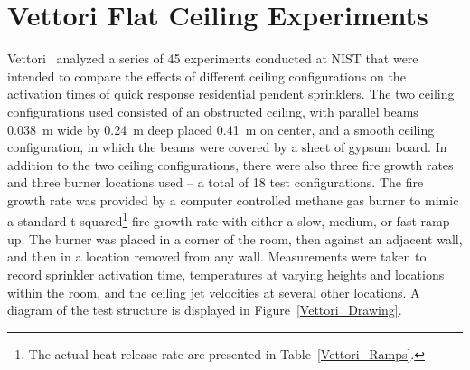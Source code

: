 \section{Vettori Flat Ceiling Experiments}

Vettori~\cite{Vettori:1} analyzed a series of 45 experiments conducted at NIST that were intended to compare the effects of different ceiling configurations on the activation times of quick response residential pendent sprinklers. The two ceiling configurations used consisted of an obstructed ceiling, with parallel beams 0.038~m wide by 0.24~m deep placed 0.41~m on center, and a smooth ceiling configuration, in which the beams were covered by a sheet of gypsum board.  In addition to the two ceiling configurations, there were also three fire growth rates and three burner locations used -- a total of 18 test configurations. The fire growth rate was provided by a computer controlled methane gas burner to mimic a standard t-squared\footnote{The actual heat release rate are presented in Table~\ref{Vettori_Ramps}.} fire growth rate with either a slow, medium, or fast ramp up. The burner was placed in a corner of the room, then against an adjacent wall, and then in a location removed from any wall. Measurements were taken to record sprinkler activation time, temperatures at varying heights and locations within the room, and the ceiling jet velocities at several other locations.  A diagram of the test structure is displayed in Figure~\ref{Vettori_Drawing}.

